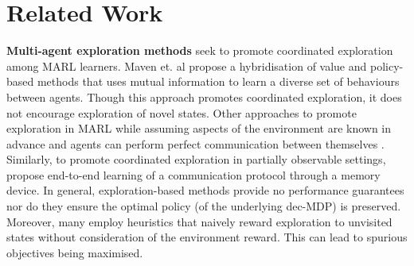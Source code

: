 \documentclass{article}
\begin{document}
\section{Related Work}
\textbf{Multi-agent exploration methods} seek to promote coordinated exploration among MARL learners. Maven et. al \cite{mahajan2019maven} propose a hybridisation of value and policy-based methods that uses mutual information to learn a diverse set of behaviours between agents. Though this approach promotes coordinated exploration, it does not encourage exploration of novel states. Other approaches to promote exploration in MARL while assuming aspects of the environment are known in advance and agents can perform perfect communication between themselves \cite{viseras2016decentralized}.  Similarly, to promote coordinated exploration in partially observable settings,   \cite{pesce2020improving} propose end-to-end learning of a communication protocol through a memory device. In general, exploration-based methods provide no performance guarantees nor do they ensure the optimal policy (of the underlying dec-MDP) is preserved. Moreover, many employ heuristics that naively reward exploration to unvisited states without consideration of the environment reward. This can lead to spurious objectives being maximised.
\newline
% 
% 
%  
% 
\end{document}
